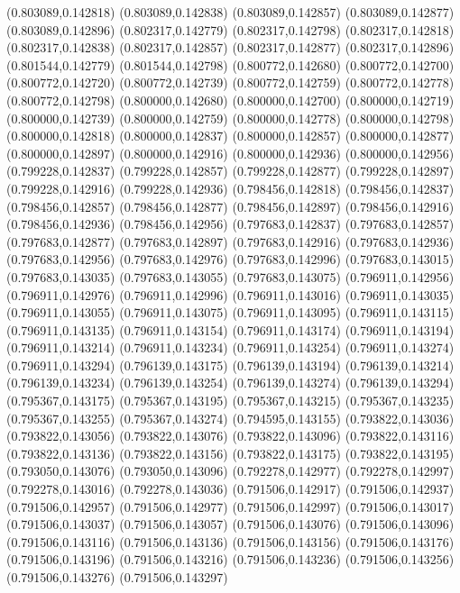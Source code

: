 (0.803089,0.142818)
(0.803089,0.142838)
(0.803089,0.142857)
(0.803089,0.142877)
(0.803089,0.142896)
(0.802317,0.142779)
(0.802317,0.142798)
(0.802317,0.142818)
(0.802317,0.142838)
(0.802317,0.142857)
(0.802317,0.142877)
(0.802317,0.142896)
(0.801544,0.142779)
(0.801544,0.142798)
(0.800772,0.142680)
(0.800772,0.142700)
(0.800772,0.142720)
(0.800772,0.142739)
(0.800772,0.142759)
(0.800772,0.142778)
(0.800772,0.142798)
(0.800000,0.142680)
(0.800000,0.142700)
(0.800000,0.142719)
(0.800000,0.142739)
(0.800000,0.142759)
(0.800000,0.142778)
(0.800000,0.142798)
(0.800000,0.142818)
(0.800000,0.142837)
(0.800000,0.142857)
(0.800000,0.142877)
(0.800000,0.142897)
(0.800000,0.142916)
(0.800000,0.142936)
(0.800000,0.142956)
(0.799228,0.142837)
(0.799228,0.142857)
(0.799228,0.142877)
(0.799228,0.142897)
(0.799228,0.142916)
(0.799228,0.142936)
(0.798456,0.142818)
(0.798456,0.142837)
(0.798456,0.142857)
(0.798456,0.142877)
(0.798456,0.142897)
(0.798456,0.142916)
(0.798456,0.142936)
(0.798456,0.142956)
(0.797683,0.142837)
(0.797683,0.142857)
(0.797683,0.142877)
(0.797683,0.142897)
(0.797683,0.142916)
(0.797683,0.142936)
(0.797683,0.142956)
(0.797683,0.142976)
(0.797683,0.142996)
(0.797683,0.143015)
(0.797683,0.143035)
(0.797683,0.143055)
(0.797683,0.143075)
(0.796911,0.142956)
(0.796911,0.142976)
(0.796911,0.142996)
(0.796911,0.143016)
(0.796911,0.143035)
(0.796911,0.143055)
(0.796911,0.143075)
(0.796911,0.143095)
(0.796911,0.143115)
(0.796911,0.143135)
(0.796911,0.143154)
(0.796911,0.143174)
(0.796911,0.143194)
(0.796911,0.143214)
(0.796911,0.143234)
(0.796911,0.143254)
(0.796911,0.143274)
(0.796911,0.143294)
(0.796139,0.143175)
(0.796139,0.143194)
(0.796139,0.143214)
(0.796139,0.143234)
(0.796139,0.143254)
(0.796139,0.143274)
(0.796139,0.143294)
(0.795367,0.143175)
(0.795367,0.143195)
(0.795367,0.143215)
(0.795367,0.143235)
(0.795367,0.143255)
(0.795367,0.143274)
(0.794595,0.143155)
(0.793822,0.143036)
(0.793822,0.143056)
(0.793822,0.143076)
(0.793822,0.143096)
(0.793822,0.143116)
(0.793822,0.143136)
(0.793822,0.143156)
(0.793822,0.143175)
(0.793822,0.143195)
(0.793050,0.143076)
(0.793050,0.143096)
(0.792278,0.142977)
(0.792278,0.142997)
(0.792278,0.143016)
(0.792278,0.143036)
(0.791506,0.142917)
(0.791506,0.142937)
(0.791506,0.142957)
(0.791506,0.142977)
(0.791506,0.142997)
(0.791506,0.143017)
(0.791506,0.143037)
(0.791506,0.143057)
(0.791506,0.143076)
(0.791506,0.143096)
(0.791506,0.143116)
(0.791506,0.143136)
(0.791506,0.143156)
(0.791506,0.143176)
(0.791506,0.143196)
(0.791506,0.143216)
(0.791506,0.143236)
(0.791506,0.143256)
(0.791506,0.143276)
(0.791506,0.143297)
